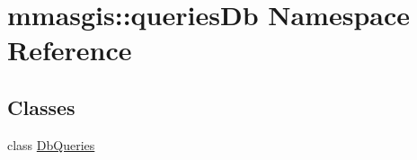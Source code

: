 \hypertarget{namespacemmasgis_1_1queriesDb}{
\section{mmasgis::queriesDb Namespace Reference}
\label{namespacemmasgis_1_1queriesDb}
}
\subsection*{Classes}
\begin{DoxyCompactItemize}
\item 
class \hyperlink{classmmasgis_1_1queriesDb_1_1DbQueries}{DbQueries}
\end{DoxyCompactItemize}

